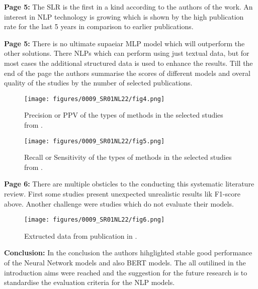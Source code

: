     \textbf{Page 5:}
    The SLR is the first in a kind according to the authors of the work. An interest in NLP technology is growing which is shown by the high publication rate for the last 5 years in comparison to earlier publications.
    
    \textbf{Page 5:}
    There is no ultimate supaeiar MLP model which will outperform the other solutions. There NLPs which can perform using just textual data, but for most cases the additional structured data is used to enhance the results. Till the end of the page the authors summarise the scores of different models and overal quality of the studies by the number of selected publications.
    \begin{figure}[H]
        \centering
        \texttt{[image: figures/0009\_SR01NL22/fig4.png]}
        \caption{Precision or PPV of the types of methods in the selected studies from \cite{x349}.}
        \label{fig4:0009_SR01ES23}
    \end{figure}
    \begin{figure}[H]
        \centering
        \texttt{[image: figures/0009\_SR01NL22/fig5.png]}
        \caption{Recall or Sensitivity of the types of methods in the selected studies from \cite{x349}.}
        \label{fig5:0009_SR01ES23}
    \end{figure}
    
    \textbf{Page 6:}
    There are multiple obsticles to the conducting this systematic literature review. First some studies present unexpected unrealistic results lik F1-score above. Another challenge were studies which do not evaluate their models. 
    \begin{figure}[H]
        \centering
        \texttt{[image: figures/0009\_SR01NL22/fig6.png]}
        \caption{Extructed data from publication in \cite{x349}.}
        \label{fig6:0009_SR01ES23}
    \end{figure}
    
    \textbf{Conclusion:}
    In the conclusion the authors hihglighted stable good performance of the Neural Network models and also BERT models. The all outilined in the introduction aims were reached and the suggestion for the future research is to standardise the evaluation criteria for the NLP models.
